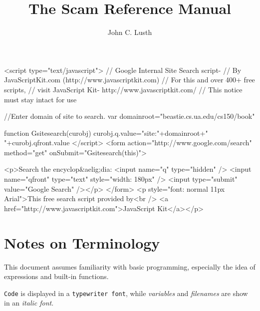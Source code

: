 \documentclass{book}
\title{The Scam Reference Manual}
\author{John C. Lusth}
\begin{document}
\maketitle

\W\htmlrule
\W{}
\W\htmlrule

\begin{rawxml}
<script
    type="text/javascript">
    // Google Internal Site Search script-
    // By JavaScriptKit.com (http://www.javascriptkit.com)
    // For this and over 400+ free scripts,
    // visit JavaScript Kit- http://www.javascriptkit.com/
    // This notice must stay intact for use

    //Enter domain of site to search.
    var domainroot="beastie.cs.ua.edu/cs150/book"

    function Gsitesearch(curobj)
        {
        curobj.q.value="site:"+domainroot+" "+curobj.qfront.value
        }
    </script>
<form
    action="http://www.google.com/search"
    method="get" onSubmit="Gsitesearch(this)">

    <p>Search the encyclop&aelig;dia: 
    <input name="q" type="hidden" />
    <input name="qfront" type="text" style="width: 180px" />
    <input type="submit" value="Google Search" /></p>
    </form>
<p style="font: normal 11px Arial">This free search script provided by<br />
<a href="http://www.javascriptkit.com">JavaScript Kit</a></p>

\end{rawxml}

%


\tableofcontents
\setcounter{tocdepth}{2} 

\chapter{Notes on Terminology}
\label{NotesOnTerminology}

This document assumes familiarity with basic programming,
especially the idea of expressions and built-in functions.

\verb!Code! is displayed in a \verb!typewriter font!, while {\it variables}
and {\it filenames} are show in an {\it italic font}.
\end{document}
